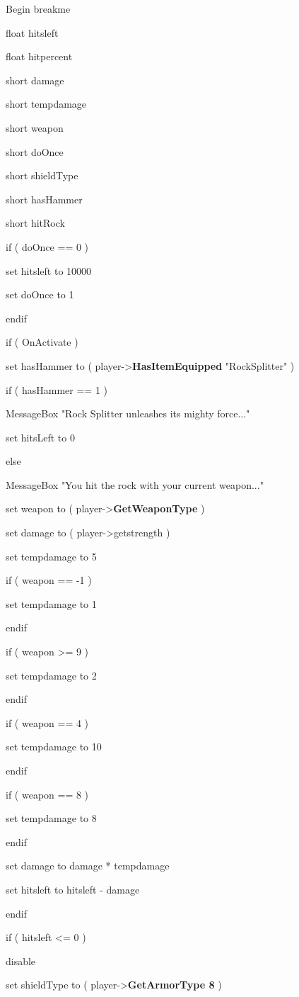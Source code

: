 \documentclass[
]{article}
\begin{document}
Begin breakme

float hitsleft

float hitpercent

short damage

short tempdamage

short weapon

short doOnce

short shieldType

short hasHammer

short hitRock

if ( doOnce == 0 )

set hitsleft to 10000

set doOnce to 1

endif

if ( OnActivate )

set hasHammer to ( player-\textgreater{}\textbf{HasItemEquipped}
"RockSplitter" )

if ( hasHammer == 1 )

MessageBox "Rock Splitter unleashes its mighty force..."

set hitsLeft to 0

else

MessageBox "You hit the rock with your current weapon..."

set weapon to ( player-\textgreater{}\textbf{GetWeaponType} )

set damage to ( player-\textgreater getstrength )

set tempdamage to 5

if ( weapon == -1 )

set tempdamage to 1

endif

if ( weapon \textgreater= 9 )

set tempdamage to 2

endif

if ( weapon == 4 )

set tempdamage to 10

endif

if ( weapon == 8 )

set tempdamage to 8

endif

set damage to damage * tempdamage

set hitsleft to hitsleft - damage

endif

if ( hitsleft \textless= 0 )

disable

set shieldType to ( player-\textgreater{}\textbf{GetArmorType 8} )
\end{document}
